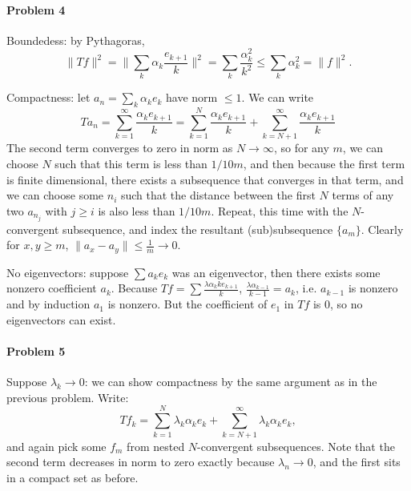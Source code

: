 \documentclass[12pt]{article}
\begin{document}
\paragraph{Problem 4}

Boundedess: by Pythagoras,
\begin{displaymath}
  \|Tf\|^2 = \|\sum_k\alpha_k\frac{e_{k+1}}{k}\|^2 = \sum_k\frac{\alpha^2_k}{k^2}
  \leq \sum_k \alpha^2_k = \|f\|^2.
\end{displaymath}

Compactness: let $a_n=\sum_k\alpha_ke_k$ have norm $\leq 1$. We can write
\begin{displaymath}
  Ta_n = \sum_{k=1}^\infty\frac{\alpha_ke_{k+1}}{k} = 
  \sum_{k=1}^N\frac{\alpha_ke_{k+1}}{k} + \sum_{k=N+1}^\infty \frac{\alpha_ke_{k+1}}
  {k}
\end{displaymath}
The second term converges to zero in norm as $N \to \infty$, so for any $m$, we can
choose $N$ such that this term is less than $1/{10m}$, and then because the
first term is finite dimensional, there exists a subsequence that converges
in that term, and we can choose some $n_i$ such that the distance
between the first $N$ terms of any two $a_{n_j}$ with $j\geq i$ is also less than
$1/{10m}$. Repeat, this time with the $N$-convergent subsequence, and index
the resultant (sub)subsequence $\{a_m\}$. Clearly for $x, y \geq m$, $\|a_x
- a_y\| \leq \frac{1}{m} \to 0$.

No eigenvectors: suppose $\sum a_ke_k$ was an eigenvector, then there exists
some nonzero coefficient $a_k$. Because $Tf = \sum \frac{\lambda \alpha_{k}{k}
  e_{k+1}}{k}$, $\frac{\lambda\alpha_{k-1}}{k-1} = a_k$, i.e. $a_{k-1}$ is
nonzero and by induction $a_1$ is nonzero. But the coefficient of $e_1$ in $Tf$
is 0, so no eigenvectors can exist.



\paragraph{Problem 5}

Suppose $\lambda_k \to 0$: we can show compactness by the same argument as in
the previous problem. Write:
\begin{displaymath}
  Tf_k = \sum_{k=1}^N\lambda_k\alpha_ke_k + \sum_{k=N+1}^\infty\lambda_k\alpha_ke_k,
\end{displaymath}
and again pick some $f_m$ from nested $N$-convergent subsequences. Note that
the second term decreases in norm to zero exactly because $\lambda_n\to 0$, and
the first sits in a compact set as before.
\end{document}
